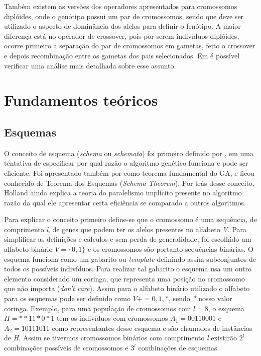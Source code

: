 Também existem as versões dos operadores apresentados para cromossomos diplóides, onde o genótipo possui um par de cromossomos, sendo que deve ser utilizado o aspecto de dominância dos alelos para definir o fenótipo. A maior diferença está no operador de crossover, pois por serem indivíduos diplóides, ocorre primeiro a separação do par de cromossomos em gametas, feito o crossover e depois recombinação entre os gametas dos pais selecionados. Em \cite{Goldberg1989} é possível verificar uma análise mais detalhada sobre esse assunto.

\section{Fundamentos teóricos}
\subsection{Esquemas}
\label{sec:esquemas}
O conceito de esquema (\textit{schema} ou \textit{schemata}) foi primeiro definido por \citeauthor{Holland1992}, em uma tentativa de especificar por qual razão o algoritmo genético funciona e pode ser eficiente. Foi apresentado também por \citeauthor{Goldberg1989} como teorema fundamental do GA, e ficou conhecido de Teorema dos Esquemas (\textit{Schema Theorem}). Por trás desse conceito, Holland ainda explica a teoria do paralelismo implícito presente no algoritmo razão da qual ele apresentar certa eficiência se comparado a outros algoritmos.

Para explicar o conceito primeiro define-se que o cromossomo é uma sequência, de comprimento \textit{l}, de genes que podem ter os alelos presentes no alfabeto \textit{V}. Para simplificar as definições e cálculos e sem perda de generalidade, foi escolhido um alfabeto binário \(V = \{0, 1\}\) e os cromossomos são portanto sequências binárias. O esquema funciona como um gabarito ou \textit{template} definindo assim subconjuntos de todos os possíveis indivíduos. Para realizar tal gabarito o esquema usa um outro elemento considerado um coringa, que representa uma posição no cromossomo que não importa (\textit{don't care}). Assim para o alfabeto binário utilizado o alfabeto para os esquemas pode ser definido como \(V+ = {0, 1 , *}\), sendo \textit{*} nosso valor coringa. Exemplo, para uma população de cromossomos com \(l=8\), o esquema \(H=**11*0*1\) tem os indivíduos com cromossomos \(A_1=00110001\) e \(A_2=10111011\) como representantes desse esquema e são chamados de instâncias de \textit{H}. Assim se tivermos cromossomos binários com comprimento \textit{l} existirão \(2^l\) combinações possíveis de cromossomos e \(3^l\) combinações de esquemas.

